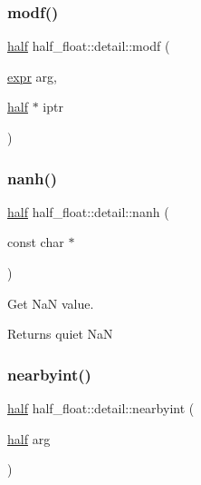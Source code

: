 \subsubsection{\texorpdfstring{modf()}{modf()}\hspace{0.1cm}{\footnotesize\ttfamily [2/2]}}
{\footnotesize\ttfamily \hyperlink{classhalf__float_1_1half}{half} half\+\_\+float\+::detail\+::modf (\begin{DoxyParamCaption}\item[{\hyperlink{structhalf__float_1_1detail_1_1expr}{expr}}]{arg,  }\item[{\hyperlink{classhalf__float_1_1half}{half} $\ast$}]{iptr }\end{DoxyParamCaption})\hspace{0.3cm}{\ttfamily [inline]}}

\mbox{\label{namespacehalf__float_1_1detail_af73da38f1f425ad36f7c90268d401397}} 
\subsubsection{\texorpdfstring{nanh()}{nanh()}}
{\footnotesize\ttfamily \hyperlink{classhalf__float_1_1half}{half} half\+\_\+float\+::detail\+::nanh (\begin{DoxyParamCaption}\item[{const char $\ast$}]{ }\end{DoxyParamCaption})\hspace{0.3cm}{\ttfamily [inline]}}

Get NaN value. \begin{DoxyReturn}{Returns}
quiet NaN 
\end{DoxyReturn}
\mbox{\label{namespacehalf__float_1_1detail_aa18533c0035bfe9c4f143acfd2b47272}} 
\subsubsection{\texorpdfstring{nearbyint()}{nearbyint()}\hspace{0.1cm}{\footnotesize\ttfamily [1/2]}}
{\footnotesize\ttfamily \hyperlink{classhalf__float_1_1half}{half} half\+\_\+float\+::detail\+::nearbyint (\begin{DoxyParamCaption}\item[{\hyperlink{classhalf__float_1_1half}{half}}]{arg }\end{DoxyParamCaption})\hspace{0.3cm}{\ttfamily [inline]}}

